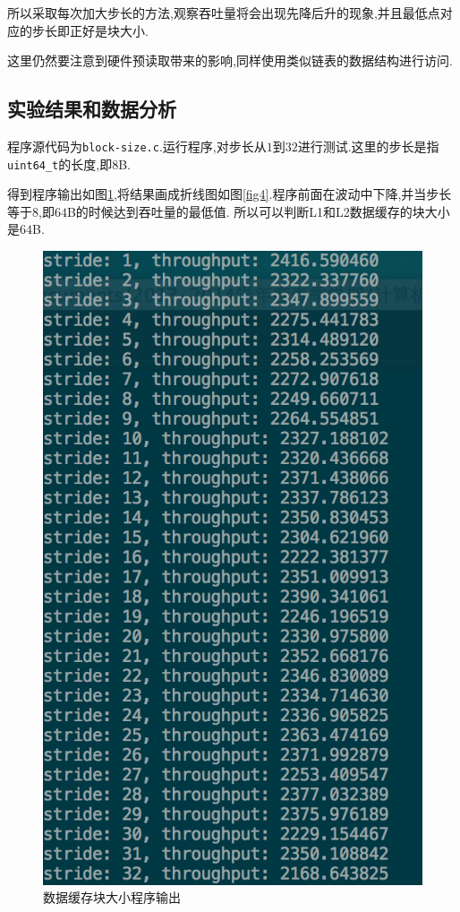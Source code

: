 \documentclass[adobefonts, nocap]{ctexart}
\begin{document}
      所以采取每次加大步长的方法,观察吞吐量将会出现先降后升的现象,并且最低点对应的步长即正好是块大小.

      这里仍然要注意到硬件预读取带来的影响,同样使用类似链表的数据结构进行访问.
    \subsection{实验结果和数据分析}
      程序源代码为\texttt{block-size.c}.运行程序,对步长从$1$到$32$进行测试.这里的步长是指\texttt{uint64\_t}的长度,即$8$B.

      得到程序输出如图\ref{fig3},将结果画成折线图如图\ref{fig4}.程序前面在波动中下降,并当步长等于$8$,即$64$B的时候达到吞吐量的最低值.
      所以可以判断L1和L2数据缓存的块大小是$64$B.

      \begin{figure}[htbp]
        \includegraphics[width=12cm]{3.png}
        \caption{数据缓存块大小程序输出}
        \label{fig3}
      \end{figure}
\end{document}
